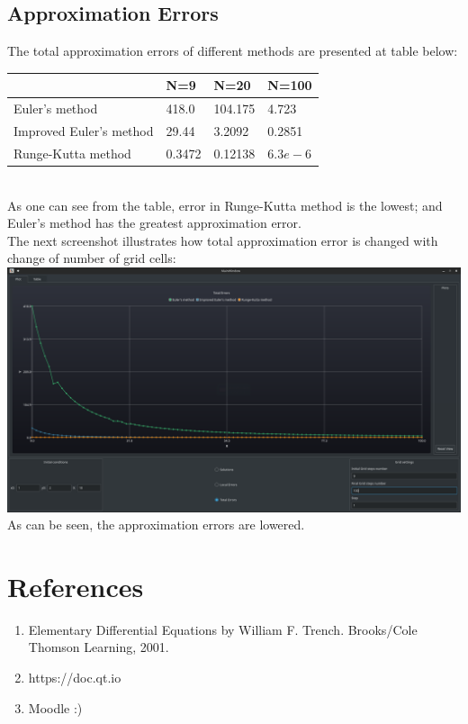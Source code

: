 \documentclass[a4paper,12pt]{article}
\begin{document}
\subsection{Approximation Errors}
The total approximation errors of different methods are presented at table below:\\
\begin{tabular}{|l|l|l|l|}
    \hline
                            & N=9   & N=20   & N=100   \\ \hline
    Euler's method          & 418.0 & 104.175  & 4.723     \\ \hline
    Improved Euler's method & 29.44 & 3.2092  & 0.2851   \\ \hline
    Runge-Kutta method      & 0.3472 & 0.12138 & $6.3e-6$ \\ \hline
\end{tabular}\\
As one can see from the table, error in Runge-Kutta method is the lowest;
and Euler's method has the greatest approximation error.\\
The next screenshot illustrates how total approximation error is changed with change
of number of grid cells:\\
\includegraphics[width=\linewidth]{shot4.png}
As can be seen, the approximation errors are lowered.
\section{References}
\begin{enumerate}
    \item Elementary Differential Equations by William F. Trench.
    Brooks/Cole Thomson Learning, 2001.  
    \item https://doc.qt.io
    \item Moodle :)
\end{enumerate}
\end{document}
